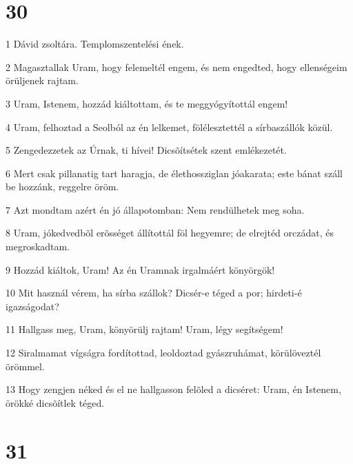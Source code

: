 \chapter{30}

\par 1 Dávid zsoltára. Templomszentelési ének.
\par 2 Magasztallak Uram, hogy felemeltél engem, és nem engedted, hogy ellenségeim örüljenek rajtam.
\par 3 Uram, Istenem, hozzád kiáltottam, és te meggyógyítottál engem!
\par 4 Uram, felhoztad a Seolból az én lelkemet, fölélesztettél a sírbaszállók közül.
\par 5 Zengedezzetek az Úrnak, ti hívei! Dicsõítsétek szent emlékezetét.
\par 6 Mert csak pillanatig tart haragja, de élethossziglan jóakarata; este bánat száll be hozzánk, reggelre öröm.
\par 7 Azt mondtam azért én jó állapotomban: Nem rendülhetek meg soha.
\par 8 Uram, jókedvedbõl erõsséget állítottál föl hegyemre; de elrejtéd orczádat, és megroskadtam.
\par 9 Hozzád kiáltok, Uram! Az én Uramnak irgalmáért könyörgök!
\par 10 Mit használ vérem, ha sírba szállok? Dicsér-e téged a por; hirdeti-é igazságodat?
\par 11 Hallgass meg, Uram, könyörülj rajtam! Uram, légy segítségem!
\par 12 Siralmamat vígságra fordítottad, leoldoztad gyászruhámat, körülöveztél örömmel.
\par 13 Hogy zengjen néked és el ne hallgasson felõled a dicséret: Uram, én Istenem, örökké dicsõítlek téged.

\chapter{31}

